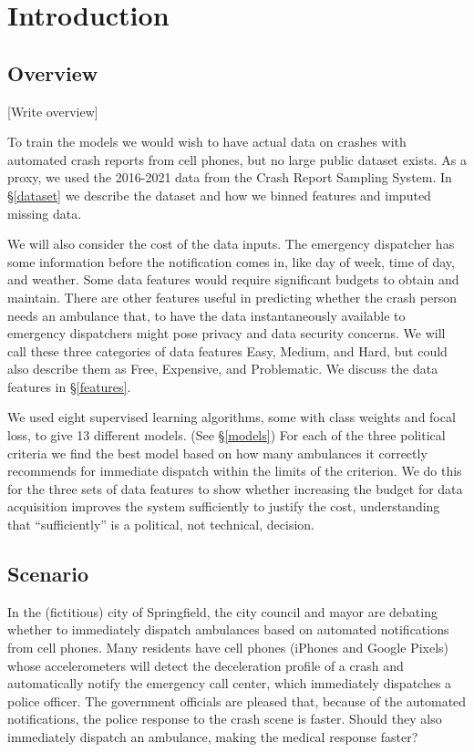 \section{Introduction}
\label{intro}

\subsection{Overview}
\label{intro_overview}

[Write overview]

To train the models we would wish to have actual data on crashes with automated crash reports from cell phones, but no large public dataset exists.  As a proxy, we used the 2016-2021 data from the Crash Report Sampling System.  In \S \ref{dataset} we describe the dataset and how we binned features and imputed missing data.  

We will also consider the cost of the data inputs.  The emergency dispatcher has some information before the notification comes in, like day of week, time of day, and weather.  Some data features would require significant budgets to obtain and maintain.  There are other features useful in predicting whether the crash person needs an ambulance that, to have the data instantaneously available to emergency dispatchers might pose privacy and data security concerns.  We will call these three categories of data features Easy, Medium, and Hard, but could also describe them as Free, Expensive, and Problematic.  We discuss the data features in \S \ref{features}.

We used eight supervised learning algorithms, some with class weights and focal loss, to give 13 different models.   (See \S \ref{models}) For each of the three political criteria we find the best model based on how many ambulances it correctly recommends for immediate dispatch within the limits of the criterion.  We do this for the three sets of data features to show whether increasing the budget for data acquisition improves the system sufficiently to justify the cost, understanding that ``sufficiently'' is a political, not technical, decision.  



\subsection{Scenario}
\label{intro_scenario}

In the (fictitious) city of Springfield, the city council and mayor are debating whether to immediately dispatch ambulances based on automated notifications from cell phones.  Many residents have cell phones (iPhones and Google Pixels) whose accelerometers will detect the deceleration profile of a crash and automatically notify the emergency call center, which immediately dispatches a police officer.  The government officials are pleased that, because of the automated notifications, the police response to the crash scene is faster.  Should they also immediately dispatch an ambulance, making the medical response faster?

